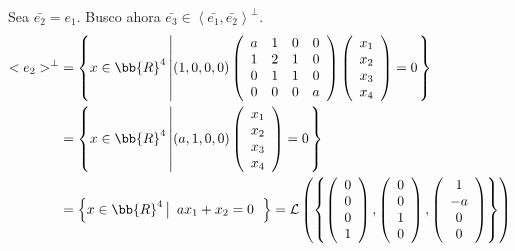 \begin{ejercicio}
\begin{enumerate}
        Sea $\bar{e_2} = e_1$. Busco ahora $\bar{e_3}\in \left<\bar{e_1},\bar{e_2}\right>^\perp$.
        \begin{equation*}\begin{split}
            <e_2>^\perp & = \left\{x\in \bb{R}^4 \left|
            (1, 0, 0, 0)\left( \begin{array}{cccc}
                a & 1 & 0 & 0 \\
                1 & 2 & 1 & 0 \\
                0 & 1 & 1 & 0 \\
                0 & 0 & 0 & a
            \end{array}\right)
            \left( \begin{array}{c}
                x_1 \\ x_2 \\ x_3 \\ x_4
            \end{array}\right)
            = 0
            \right.\right\}\\
            & = \left\{x\in \bb{R}^4 \left|
            (a,1,0,0)
            \left( \begin{array}{c}
                x_1 \\ x_2 \\ x_3 \\ x_4
            \end{array}\right)
            = 0
            \right.\right\} \\
            &= \left\{x\in \bb{R}^4 \left|
            \begin{array}{c}
                ax_1 + x_2 = 0
            \end{array}
            \right.\right\} = \mathcal{L} \left( \left\{
            \left( \begin{array}{c}
                0 \\ 0 \\ 0 \\ 1
            \end{array} \right),
            \left( \begin{array}{c}
                0 \\ 0 \\ 1 \\ 0
            \end{array} \right),
            \left( \begin{array}{c}
                1 \\ -a \\ 0 \\ 0
            \end{array} \right)
            \right\}\right)
        \end{split}\end{equation*}


\end{enumerate}
\end{ejercicio}
